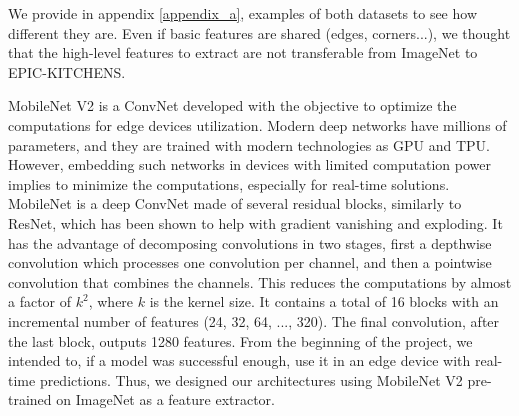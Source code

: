 \documentclass[12pt, a4paper]{report}
\begin{document}
				We provide in appendix \ref{appendix_a}, examples of both datasets to see how different they are.
				Even if basic features are shared (edges, corners...), we thought that the high-level features to extract are not transferable from ImageNet to EPIC-KITCHENS.
				\par
				{\boldtahomafont MobileNet V2} \cite{sandler2019mobilenetv2} is a ConvNet developed with the objective to optimize the computations for edge devices utilization.
				Modern deep networks have millions of parameters, and they are trained with modern technologies as GPU and TPU.
				However, embedding such networks in devices with limited computation power implies to minimize the computations, especially for real-time solutions.
				MobileNet is a deep ConvNet made of several residual blocks, similarly to ResNet, which has been shown to help with gradient vanishing and exploding.
				It has the advantage of decomposing convolutions in two stages, first a depthwise convolution which processes one convolution per channel, and then a pointwise convolution that combines the channels.
				This reduces the computations by almost a factor of $k^{2}$, where $k$ is the kernel size.
				It contains a total of 16 blocks with an incremental number of features (24, 32, 64, ..., 320).
				The final convolution, after the last block, outputs 1280 features.
				From the beginning of the project, we intended to, if a model was successful enough, use it in an edge device with real-time predictions.
				Thus, we designed our architectures using MobileNet V2 pre-trained on ImageNet as a feature extractor.
\end{document}
